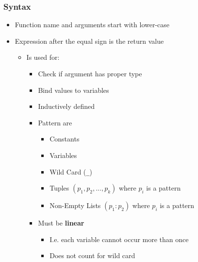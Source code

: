 \subsubsection{Syntax}
\begin{itemize}
        \begin{itemize}
            \item Function name and arguments start with lower-case
            \item Expression after the equal sign is the return value
                \begin{itemize}
                    \item Is used for:
                        \begin{itemize}
                            \item Check if argument has proper type
                            \item Bind values to variables
                        \end{itemize}
                        \begin{itemize}
                            \item Inductively defined
                            \item Pattern are
                                \begin{itemize}
                                    \item Constants
                                    \item Variables
                                    \item Wild Card (\verb+_+)
                                    \item Tuples $(p_1, p_2, ... , p_k)$ where $p_i$ is a pattern
                                    \item Non-Empty Lists $(p_1 : p_2)$ where $p_i$ is a pattern
                                \end{itemize}
                            \item Must be \textbf{linear}
                                \begin{itemize}
                                    \item I.e. each variable cannot occur more than once
                                    \item Does not count for wild card
                                \end{itemize}

\end{itemize}
\end{itemize}
\end{itemize}
\end{itemize}

